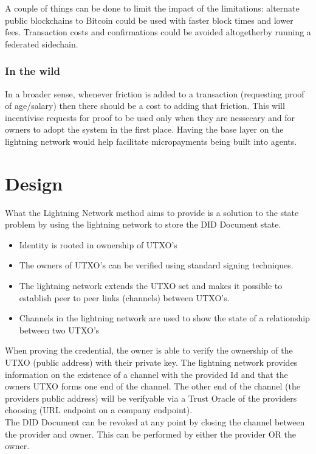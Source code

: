 \documentclass[10pt,a4paper]{runcrypto}
\begin{document}
A couple of things can be done to limit the impact of the limitations: alternate public blockchains to Bitcoin could be used with faster block times and lower fees. Transaction costs and confirmations could be avoided altogetherby running a federated sidechain.

\subsubsection{In the wild}
In a broader sense, whenever friction is added to a transaction (requesting proof of age/salary) then there should be a cost to adding that friction. This will incentivise requests for proof to be used only when they are nessecary and for owners to adopt the system in the first place. Having the base layer on the lightning network would help facilitate micropayments being built into agents.

\section{Design}
What the Lightning Network method aims to provide is a solution to the state problem by using the lightning network to store the DID Document state.
\begin{itemize}
	\item Identity is rooted in ownership of UTXO's
    \item The owners of UTXO's can be verified using standard signing techniques.
    \item The lightning network extends the UTXO set and makes it possible to establish peer to peer links (channels) between UTXO's.
    \item Channels in the lightning network are used to show the state of a relationship between two UTXO's
\end{itemize}

When proving the credential, the owner is able to verify the ownership of the UTXO (public address) with their private key. The lightning network provides information on the existence of a channel with the provided Id and that the owners UTXO forms one end of the channel. The other end of the channel (the providers public address) will be verifyable via a Trust Oracle of the providers choosing (URL endpoint on a company endpoint).
\\
The DID Document can be revoked at any point by closing the channel between the provider and owner. This can be performed by either the provider OR the owner.
\end{document}
